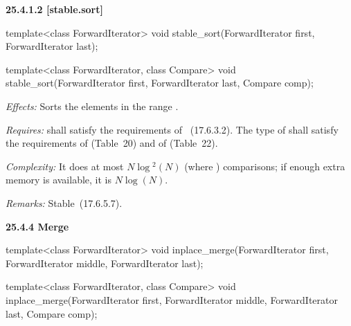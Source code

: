 \documentclass{isocpp_proposal}
\begin{document}
\textbf{25.4.1.2  [stable.sort]}

\begin{itemdecl}
template<class ForwardIterator>
  void stable_sort(ForwardIterator first, ForwardIterator last);

template<class ForwardIterator, class Compare>
  void stable_sort(ForwardIterator first, ForwardIterator last,
                   Compare comp);
\end{itemdecl}

\begin{itemdescr}
\pnum
\emph{Effects:} Sorts the elements in the range \tcode{[first, last)}.

\pnum
\emph{Requires:}  shall satisfy the requirements of
~(17.6.3.2). The type of  shall satisfy the requirements of  (Table~20) and of  (Table~22).

\pnum
\emph{Complexity:} It does at most $N \log{}^2 (N)$ (where )
comparisons; if enough extra memory is available, it is $N \log{}(N)$.

\pnum
\emph{Remarks:} Stable~(17.6.5.7).
\end{itemdescr}

\textbf{25.4.4 Merge}

\begin{itemdecl}
template<class ForwardIterator>
  void inplace_merge(ForwardIterator first,
                     ForwardIterator middle,
                     ForwardIterator last);

template<class ForwardIterator, class Compare>
  void inplace_merge(ForwardIterator first,
                     ForwardIterator middle,                    
                     ForwardIterator last, Compare comp);
\end{itemdecl}
\end{document}
